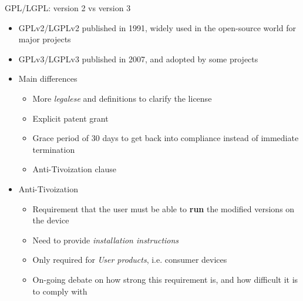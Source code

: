 \begin{frame}{GPL/LGPL: version 2 vs version 3}
  \begin{itemize}
  \item GPLv2/LGPLv2 published in 1991, widely used in the open-source
    world for major projects
  \item GPLv3/LGPLv3 published in 2007, and adopted by some projects
  \item Main differences
    \begin{itemize}
    \item More {\em legalese} and definitions to clarify the license
    \item Explicit patent grant
    \item Grace period of 30 days to get back into compliance instead
      of immediate termination
    \item Anti-Tivoization clause
    \end{itemize}
  \item Anti-Tivoization
    \begin{itemize}
    \item Requirement that the user must be able to {\bf run} the
      modified versions on the device
    \item Need to provide {\em installation instructions}
    \item Only required for {\em User products}, i.e. consumer devices
    \item On-going debate on how strong this requirement is, and how
      difficult it is to comply with
    \end{itemize}
  \end{itemize}
\end{frame}

